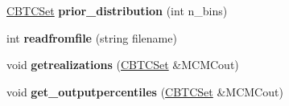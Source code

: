 \begin{DoxyCompactItemize}
\hyperlink{class_c_b_t_c_set}{C\+B\+T\+C\+Set} {\bfseries prior\+\_\+distribution} (int n\+\_\+bins)
\item 
\mbox{\label{class_c_m_c_m_c_aa5cd0561e5d4b0760a927d0830f44db9}} 
int {\bfseries readfromfile} (string filename)
\item 
\mbox{\label{class_c_m_c_m_c_ae8c0864ed8c884d7a93c5a77d30491a6}} 
void {\bfseries getrealizations} (\hyperlink{class_c_b_t_c_set}{C\+B\+T\+C\+Set} \&M\+C\+M\+Cout)
\item 
\mbox{\label{class_c_m_c_m_c_ad8991402aa97420a47693c1d81bff516}} 
void {\bfseries get\+\_\+outputpercentiles} (\hyperlink{class_c_b_t_c_set}{C\+B\+T\+C\+Set} \&M\+C\+M\+Cout)
\end{DoxyCompactItemize}
